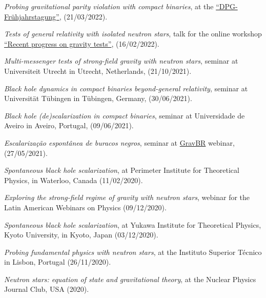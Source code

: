 \documentclass[10pt]{article}
\newcommand{\invited}{{\color{aeilbl}{invited}}}
\begin{document}
\begin{bibenum}
    \item
    \emph{Probing gravitational parity violation with compact binaries},
    at the \href{https://heidelberg22.dpg-tagungen.de/}{``DPG-Fr\"uhjahrstagung''},
    (21/03/2022).

    \item
    \emph{Tests of general relativity with isolated neutron stars},
    \invited{} talk for the online workshop \href{https://honghui-liu.github.io/gravity-test/}{``Recent progress on gravity tests''},
    (16/02/2022).

    \item
    \emph{Multi-messenger tests of strong-field gravity
    with neutron stars},
    \invited{} seminar at Universiteit Utrecht in Utrecht, Netherlands,
    (21/10/2021).

    \item
    \emph{Black hole dynamics in compact binaries beyond-general relativity},
    \invited{} seminar at Universit\"at T\"ubingen in T\"ubingen, Germany,
    (30/06/2021).

    \item
    \emph{Black hole (de)scalarization in compact binaries},
    \invited{} seminar at Universidade de Aveiro in Aveiro, Portugal,
    (09/06/2021).

    \item
    \emph{Escalariza{\c c}{\~a}o espont{\^a}nea de buracos negros},
    \invited{} seminar at \href{https://sites.google.com/view/antoniodpj/gravbr}{GravBR} webinar, (27/05/2021).

    \item
    \emph{Spontaneous black hole scalarization},
    \invited{} at Perimeter Institute for Theoretical Physics,
    in Waterloo, Canada (11/02/2020).

    \item
    \emph{Exploring the strong-field regime of gravity with neutron stars},
    \invited{} webinar for the Latin American Webinars on Physics (09/12/2020).

    \item
    \emph{Spontaneous black hole scalarization},
    \invited{} at Yukawa Institute for Theoretical Physics, Kyoto University,
    in Kyoto, Japan (03/12/2020).

    \item
    \emph{Probing fundamental physics with neutron stars},
    \invited{} at the Instituto Superior T\'ecnico
    in Lisbon, Portugal (26/11/2020).

    \item
    \emph{Neutron stars: equation of state and gravitational theory},
    \invited{} at the Nuclear Physics Journal Club, USA (2020).


\end{bibenum}
\end{document}
